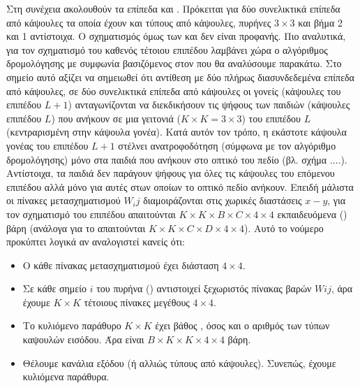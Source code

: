 Στη συνέχεια ακολουθούν τα επίπεδα  και . Πρόκειται για δύο συνελικτικά επίπεδα από κάψουλες τα οποία έχουν  και  τύπους από κάψουλες, πυρήνες $3 \times 3$ και βήμα 2 και 1 αντίστοιχα. Ο σχηματισμός όμως των  και  δεν είναι προφανής. Πιο αναλυτικά, για τον σχηματισμό του καθενός τέτοιου επιπέδου λαμβάνει χώρα ο αλγόριθμος δρομολόγησης με συμφωνία βασιζόμενος στον  που θα αναλύσουμε παρακάτω. Στο σημείο αυτό αξίζει να σημειωθεί ότι αντίθεση με δύο πλήρως διασυνδεδεμένα επίπεδα από κάψουλες, σε δύο συνελικτικά επίπεδα από κάψουλες οι γονείς (κάψουλες του επιπέδου $L + 1$) ανταγωνίζονται να διεκδικήσουν τις ψήφους των παιδιών (κάψουλες επιπέδου $L$) που ανήκουν σε μια γειτονιά ($K\times K = 3 \times 3$) του επιπέδου $L$ (κεντραρισμένη στην κάψουλα γονέα). Κατά αυτόν τον τρόπο, η εκάστοτε κάψουλα γονέας του επιπέδου $L + 1$ στέλνει ανατροφοδότηση (σύμφωνα με τον αλγόριθμο δρομολόγησης) μόνο στα παιδιά που ανήκουν στο οπτικό του πεδίο (βλ. σχήμα ....). Αντίστοιχα, τα παιδιά δεν παράγουν ψήφους για όλες τις κάψουλες του επόμενου επιπέδου αλλά μόνο για αυτές στων οποίων το οπτικό πεδίο ανήκουν. Επειδή μάλιστα οι πίνακες μετασχηματισμού $W_ij$ διαμοιράζονται στις χωρικές διαστάσεις $x-y$, για τον σχηματισμό του επιπέδου  απαιτούνται $K \times K \times B \times C \times 4 \times 4$ εκπαιδευόμενα () βάρη (ανάλογα για το  απαιτούνται $K \times K \times C \times D \times 4 \times 4$). Αυτό το νούμερο προκύπτει λογικά αν αναλογιστεί κανείς ότι:
\begin{itemize}
  \item Ο κάθε πίνακας μετασχηματισμού έχει διάσταση $4 \times 4$. 
  \item Σε κάθε σημείο $i$ του πυρήνα () αντιστοιχεί ξεχωριστός πίνακας βαρών $Wij$, άρα έχουμε $K \times K$ τέτοιους πίνακες μεγέθους $4\times 4$.
  \item Το κυλιόμενο παράθυρο $K \times K$ έχει βάθος , όσος και ο αριθμός των τύπων καψουλών εισόδου. Άρα είναι $B \times K \times K \times 4 \times 4$ βάρη.
  \item Θέλουμε  κανάλια εξόδου (ή αλλιώς τύπους από κάψουλες). Συνεπώς, έχουμε  κυλιόμενα παράθυρα.
\end{itemize}  

